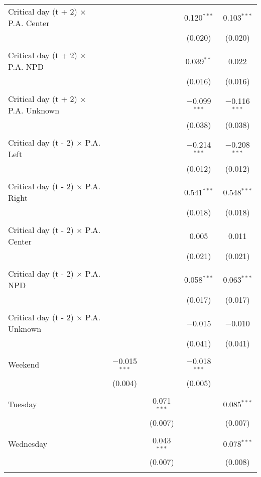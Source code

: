 \documentclass[
]{article}
\begin{document}
\begin{table}[!htbp]
{\begin{tabular}{@{\extracolsep{5pt}}lcccc}
 Critical day (t + 2) $\times$ P.A. Center &  &  & 0.120$^{***}$ & 0.103$^{***}$ \\ 
  &  &  & (0.020) & (0.020) \\ 
  & & & & \\ 
 Critical day (t + 2) $\times$ P.A. NPD &  &  & 0.039$^{**}$ & 0.022 \\ 
  &  &  & (0.016) & (0.016) \\ 
  & & & & \\ 
 Critical day (t + 2) $\times$ P.A. Unknown &  &  & $-$0.099$^{***}$ & $-$0.116$^{***}$ \\ 
  &  &  & (0.038) & (0.038) \\ 
  & & & & \\ 
 Critical day (t - 2) $\times$ P.A. Left &  &  & $-$0.214$^{***}$ & $-$0.208$^{***}$ \\ 
  &  &  & (0.012) & (0.012) \\ 
  & & & & \\ 
 Critical day (t - 2) $\times$ P.A. Right &  &  & 0.541$^{***}$ & 0.548$^{***}$ \\ 
  &  &  & (0.018) & (0.018) \\ 
  & & & & \\ 
 Critical day (t - 2) $\times$ P.A. Center &  &  & 0.005 & 0.011 \\ 
  &  &  & (0.021) & (0.021) \\ 
  & & & & \\ 
 Critical day (t - 2) $\times$ P.A. NPD &  &  & 0.058$^{***}$ & 0.063$^{***}$ \\ 
  &  &  & (0.017) & (0.017) \\ 
  & & & & \\ 
 Critical day (t - 2) $\times$ P.A. Unknown &  &  & $-$0.015 & $-$0.010 \\ 
  &  &  & (0.041) & (0.041) \\ 
  & & & & \\ 
 Weekend & $-$0.015$^{***}$ &  & $-$0.018$^{***}$ &  \\ 
  & (0.004) &  & (0.005) &  \\ 
  & & & & \\ 
 Tuesday &  & 0.071$^{***}$ &  & 0.085$^{***}$ \\ 
  &  & (0.007) &  & (0.007) \\ 
  & & & & \\ 
 Wednesday &  & 0.043$^{***}$ &  & 0.078$^{***}$ \\ 
  &  & (0.007) &  & (0.008) \\ 
  & & & & \\ 

\end{tabular}}
\end{table}
\end{document}
